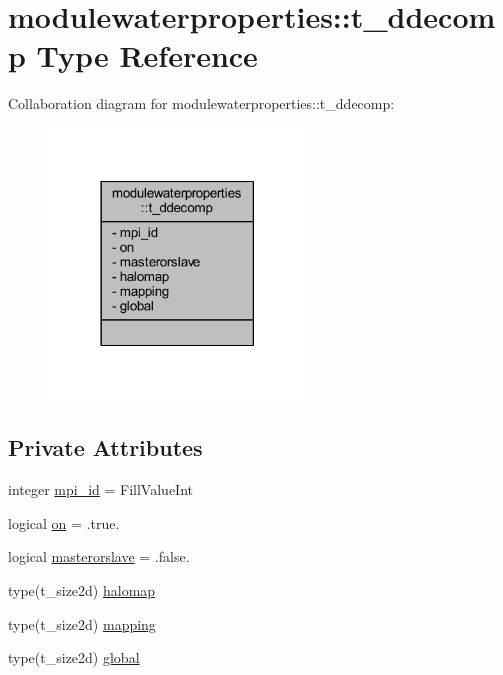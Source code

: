 \hypertarget{structmodulewaterproperties_1_1t__ddecomp}{}\section{modulewaterproperties\+:\+:t\+\_\+ddecomp Type Reference}
\label{structmodulewaterproperties_1_1t__ddecomp}


Collaboration diagram for modulewaterproperties\+:\+:t\+\_\+ddecomp\+:\nopagebreak
\begin{figure}[H]
\begin{center}
\leavevmode
\includegraphics[width=194pt]{structmodulewaterproperties_1_1t__ddecomp__coll__graph}
\end{center}
\end{figure}
\subsection*{Private Attributes}
\begin{DoxyCompactItemize}
\item 
integer \mbox{\hyperlink{structmodulewaterproperties_1_1t__ddecomp_a0634cfdf57bea9c1acd5b5bd5e310bf4}{mpi\+\_\+id}} = Fill\+Value\+Int
\item 
logical \mbox{\hyperlink{structmodulewaterproperties_1_1t__ddecomp_a3a8099bf55f5c9e0f79bff27e6b10dde}{on}} = .true.
\item 
logical \mbox{\hyperlink{structmodulewaterproperties_1_1t__ddecomp_a5d8a1faae1dfbf26d990dd6ed5a13457}{masterorslave}} = .false.
\item 
type(t\+\_\+size2d) \mbox{\hyperlink{structmodulewaterproperties_1_1t__ddecomp_afcab00b9385c18d13b64dc547aaad77a}{halomap}}
\item 
type(t\+\_\+size2d) \mbox{\hyperlink{structmodulewaterproperties_1_1t__ddecomp_a185bf71a4bb4eec6b67b43efb649d86b}{mapping}}
\item 
type(t\+\_\+size2d) \mbox{\hyperlink{structmodulewaterproperties_1_1t__ddecomp_a9c28b7740261a2ab66027abff51a0cfb}{global}}
\end{DoxyCompactItemize}


